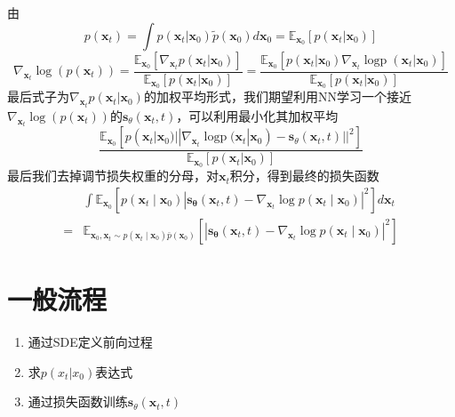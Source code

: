 \documentclass{article}
\newcommand{\nobracket}{}
\newcommand{\tmmathbf}[1]{\ensuremath{\boldsymbol{#1}}}
\newcommand{\tmop}[1]{\ensuremath{\operatorname{#1}}}
\begin{document}
\begin{CJK*}{UTF8}{gbsn}
由
\[ p (\tmmathbf{x}_t) = \int p (\tmmathbf{x}_t | \tmmathbf{x}_0 \nobracket)
   \tilde{p} (\tmmathbf{x}_0) d\tmmathbf{x}_0 =\mathbb{E}_{\tmmathbf{x}_0} [p
   (\tmmathbf{x}_t | \tmmathbf{x}_0 \nobracket)] \]
\[ \nabla_{\tmmathbf{x}_t} \log (p (\tmmathbf{x}_t)) =
   \frac{\mathbb{E}_{\tmmathbf{x}_0} [\nabla_{\tmmathbf{x}_t} p
   (\tmmathbf{x}_t | \tmmathbf{x}_0 \nobracket)]}{\mathbb{E}_{\tmmathbf{x}_0}
   [p (\tmmathbf{x}_t | \tmmathbf{x}_0 \nobracket)]} =
   \frac{\mathbb{E}_{\tmmathbf{x}_0} [p (\tmmathbf{x}_t | \tmmathbf{x}_0
   \nobracket) \nabla_{\tmmathbf{x}_t} \tmop{logp} (\tmmathbf{x}_t |
   \tmmathbf{x}_0 \nobracket)]}{\mathbb{E}_{\tmmathbf{x}_0} [p (\tmmathbf{x}_t
   | \tmmathbf{x}_0 \nobracket)]} \]
最后式子为$\nabla_{\tmmathbf{x}_t} p (\tmmathbf{x}_t | \tmmathbf{x}_0
\nobracket)$的加权平均形式，我们期望利用NN学习一个接近$\nabla_{\tmmathbf{x}_t}
\log (p (\tmmathbf{x}_t))$的$\tmmathbf{s}_{\theta} (\tmmathbf{x}_t,
t)$，可以利用最小化其加权平均
\[ \frac{\mathbb{E}_{\tmmathbf{x}_0} [p (\tmmathbf{x}_t | \tmmathbf{x}_0
   \nobracket) | | \nabla_{\tmmathbf{x}_t} \tmop{logp} (\tmmathbf{x}_t |
   \tmmathbf{x}_0 \nobracket) -\tmmathbf{s}_{\theta} (\tmmathbf{x}_t, t) |
   |^2]}{\mathbb{E}_{\tmmathbf{x}_0} [p (\tmmathbf{x}_t | \tmmathbf{x}_0
   \nobracket)]} \]
最后我们去掉调节损失权重的分母，对$\tmmathbf{x}_t$积分，得到最终的损失函数
\[ \begin{aligned}
     & \int \mathbb{E}_{\tmmathbf{x}_0}  [p (\tmmathbf{x}_t \mid
     \tmmathbf{x}_0)  | \tmmathbf{s}_{\tmmathbf{\theta}} (\tmmathbf{x}_t, t) -
     \nabla_{\tmmathbf{x}_t} \log p (\tmmathbf{x}_t \mid \tmmathbf{x}_0) |^2]
     d\tmmathbf{x}_t\\
     = & \mathbb{E}_{\tmmathbf{x}_0, \tmmathbf{x}_t \sim p (\tmmathbf{x}_t
     \mid \tmmathbf{x}_0) \bar{p} (\tmmathbf{x}_0)} [|
     \tmmathbf{s}_{\tmmathbf{\theta}} (\tmmathbf{x}_t, t) -
     \nabla_{\tmmathbf{x}_t} \log p (\tmmathbf{x}_t \mid \tmmathbf{x}_0) |^2]
   \end{aligned} \]

\section{一般流程}

\begin{enumerate}
  \item 通过SDE定义前向过程
  
  \item 求$p (x_t | x_0 \nobracket)$表达式
  
  \item 通过损失函数训练$\tmmathbf{s}_{\theta} (\tmmathbf{x}_t, t)$
  

\end{enumerate}
\end{CJK*}
\end{document}
